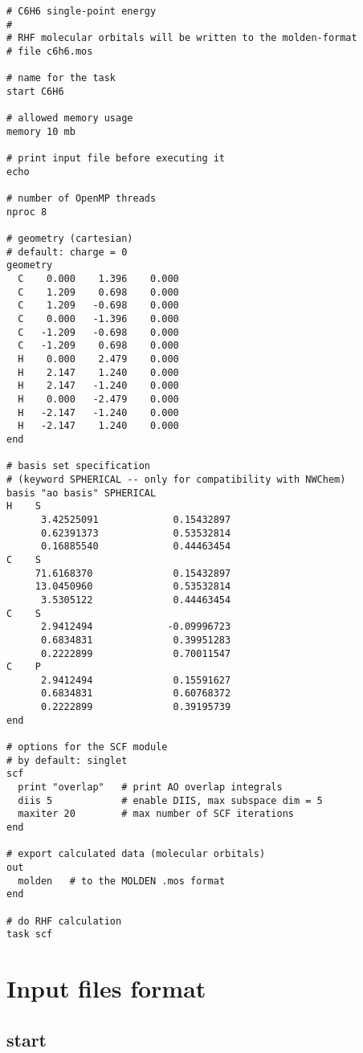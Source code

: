 \documentclass[a4paper, 12pt]{article}
\begin{document}
\begin{lstlisting}
# C6H6 single-point energy
#
# RHF molecular orbitals will be written to the molden-format
# file c6h6.mos

# name for the task
start C6H6

# allowed memory usage
memory 10 mb

# print input file before executing it
echo

# number of OpenMP threads
nproc 8

# geometry (cartesian)
# default: charge = 0
geometry
  C    0.000    1.396    0.000
  C    1.209    0.698    0.000
  C    1.209   -0.698    0.000
  C    0.000   -1.396    0.000
  C   -1.209   -0.698    0.000
  C   -1.209    0.698    0.000
  H    0.000    2.479    0.000
  H    2.147    1.240    0.000
  H    2.147   -1.240    0.000
  H    0.000   -2.479    0.000
  H   -2.147   -1.240    0.000
  H   -2.147    1.240    0.000
end

# basis set specification
# (keyword SPHERICAL -- only for compatibility with NWChem)
basis "ao basis" SPHERICAL
H    S
      3.42525091             0.15432897       
      0.62391373             0.53532814       
      0.16885540             0.44463454  
C    S
     71.6168370              0.15432897       
     13.0450960              0.53532814       
      3.5305122              0.44463454       
C    S
      2.9412494             -0.09996723
      0.6834831              0.39951283    
      0.2222899              0.70011547            
C    P
      2.9412494              0.15591627       
      0.6834831              0.60768372       
      0.2222899              0.39195739    
end

# options for the SCF module
# by default: singlet
scf
  print "overlap"   # print AO overlap integrals
  diis 5            # enable DIIS, max subspace dim = 5
  maxiter 20        # max number of SCF iterations
end

# export calculated data (molecular orbitals)
out
  molden   # to the MOLDEN .mos format
end

# do RHF calculation
task scf
\end{lstlisting}


\section{Input files format}\label{sec:details}

\subsection{start}
\end{document}
